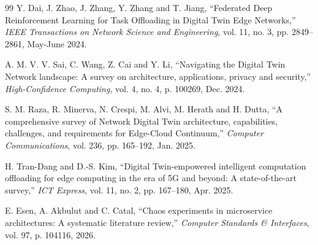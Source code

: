\begin{thebibliography}{99}
Y. Dai, J. Zhao, J. Zhang, Y. Zhang and T. Jiang, ``Federated Deep Reinforcement Learning for Task Offloading in Digital Twin Edge Networks,'' \textit{IEEE Transactions on Network Science and Engineering}, vol. 11, no. 3, pp. 2849--2861, May-June 2024.

A. M. V. V. Sai, C. Wang, Z. Cai and Y. Li, ``Navigating the Digital Twin Network landscape: A survey on architecture, applications, privacy and security,'' \textit{High-Confidence Computing}, vol. 4, no. 4, p. 100269, Dec. 2024.

S. M. Raza, R. Minerva, N. Crespi, M. Alvi, M. Herath and H. Dutta, ``A comprehensive survey of Network Digital Twin architecture, capabilities, challenges, and requirements for Edge-Cloud Continuum,'' \textit{Computer Communications}, vol. 236, pp. 165--192, Jan. 2025.

H. Tran-Dang and D.-S. Kim, ``Digital Twin-empowered intelligent computation offloading for edge computing in the era of 5G and beyond: A state-of-the-art survey,'' \textit{ICT Express}, vol. 11, no. 2, pp. 167--180, Apr. 2025.

E. Esen, A. Akbulut and C. Catal, ``Chaos experiments in microservice architectures: A systematic literature review,'' \textit{Computer Standards \& Interfaces}, vol. 97, p. 104116, 2026.

\end{thebibliography}
